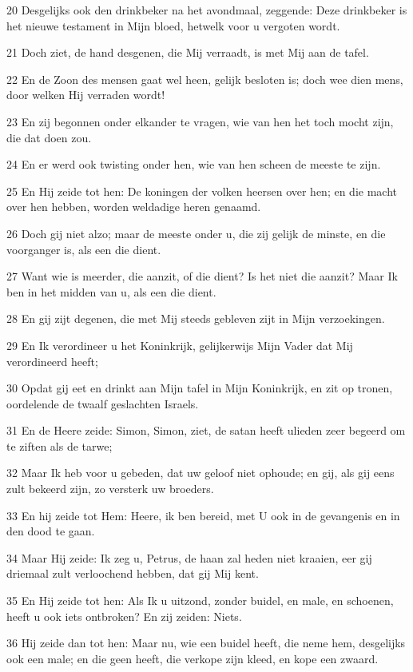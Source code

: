 \par 20 Desgelijks ook den drinkbeker na het avondmaal, zeggende: Deze drinkbeker is het nieuwe testament in Mijn bloed, hetwelk voor u vergoten wordt.
\par 21 Doch ziet, de hand desgenen, die Mij verraadt, is met Mij aan de tafel.
\par 22 En de Zoon des mensen gaat wel heen, gelijk besloten is; doch wee dien mens, door welken Hij verraden wordt!
\par 23 En zij begonnen onder elkander te vragen, wie van hen het toch mocht zijn, die dat doen zou.
\par 24 En er werd ook twisting onder hen, wie van hen scheen de meeste te zijn.
\par 25 En Hij zeide tot hen: De koningen der volken heersen over hen; en die macht over hen hebben, worden weldadige heren genaamd.
\par 26 Doch gij niet alzo; maar de meeste onder u, die zij gelijk de minste, en die voorganger is, als een die dient.
\par 27 Want wie is meerder, die aanzit, of die dient? Is het niet die aanzit? Maar Ik ben in het midden van u, als een die dient.
\par 28 En gij zijt degenen, die met Mij steeds gebleven zijt in Mijn verzoekingen.
\par 29 En Ik verordineer u het Koninkrijk, gelijkerwijs Mijn Vader dat Mij verordineerd heeft;
\par 30 Opdat gij eet en drinkt aan Mijn tafel in Mijn Koninkrijk, en zit op tronen, oordelende de twaalf geslachten Israels.
\par 31 En de Heere zeide: Simon, Simon, ziet, de satan heeft ulieden zeer begeerd om te ziften als de tarwe;
\par 32 Maar Ik heb voor u gebeden, dat uw geloof niet ophoude; en gij, als gij eens zult bekeerd zijn, zo versterk uw broeders.
\par 33 En hij zeide tot Hem: Heere, ik ben bereid, met U ook in de gevangenis en in den dood te gaan.
\par 34 Maar Hij zeide: Ik zeg u, Petrus, de haan zal heden niet kraaien, eer gij driemaal zult verloochend hebben, dat gij Mij kent.
\par 35 En Hij zeide tot hen: Als Ik u uitzond, zonder buidel, en male, en schoenen, heeft u ook iets ontbroken? En zij zeiden: Niets.
\par 36 Hij zeide dan tot hen: Maar nu, wie een buidel heeft, die neme hem, desgelijks ook een male; en die geen heeft, die verkope zijn kleed, en kope een zwaard.
